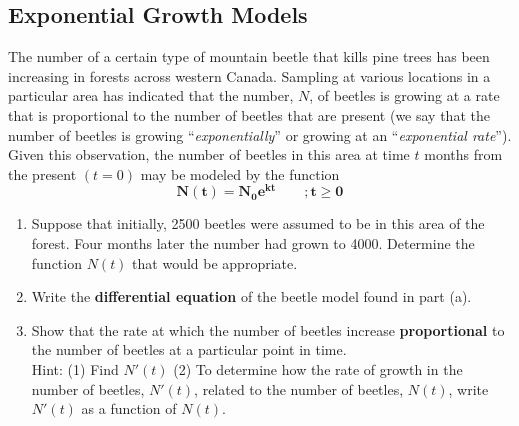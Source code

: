 \newpage
\subsection*{Exponential Growth Models}

\begin{example}
The number of a certain type of mountain beetle that kills pine trees has been increasing in forests across western Canada.  Sampling at various locations in a particular area has indicated that the number, $N$, of beetles is growing at a rate that is proportional to the number of beetles that are present (we say that the number of beetles is growing “\emph{exponentially}” or growing at an “\emph{exponential rate}”).  Given this observation, the number of beetles in this area at time $t$ months from the present $(t=0)$ may be modeled by the function
$$\bm{N(t)=N_0 e^{kt}}\qquad \bm{;t\ge 0}$$
\renewcommand{\labelenumi}{\textbf{(\alph{enumi})}}
\begin{enumerate}[leftmargin=*]
    \item Suppose that initially, 2500 beetles were assumed to be in this area of the forest.  Four months later the number had grown to 4000.  Determine the function $N(t)$ that would be appropriate.  	
    \item Write the \textbf{differential equation} of the beetle model found in part (a). 
    \newpage
    \item Show that the rate at which the number of beetles increase \textbf{proportional} to the number of beetles at a particular point in time.\\[10pt]
    Hint: (1) Find $N'(t)$ (2) To determine how the rate of growth in the number of beetles,  $N'(t)$, related to the number of beetles, $N(t)$, write $N'(t)$ as a function of $N(t)$.   
    

\end{enumerate}
\end{example}
